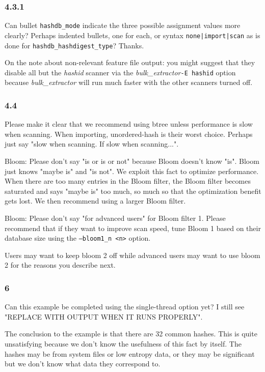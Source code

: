 \documentclass[12pt,twoside]{article}
\newcommand{\bulk}{\emph{bulk\_extractor}\xspace}
\newcommand{\hid}{\emph{hashid}\xspace}
\begin{document}
\subsubsection*{4.3.1}
Can bullet \texttt{hashdb\_mode} indicate the three possible assignment values
more clearly?
Perhaps indented bullets, one for each, or syntax \texttt{none|import|scan}
as is done for \texttt{hashdb\_hashdigest\_type}?  Thanks.

On the note about non-relevant feature file output: you might suggest that they
disable all but the \hid scanner via the \bulk \texttt{-E hashid} option
because \bulk will run much faster with the other scanners turned off.

\subsubsection*{4.4}
Please make it clear that we recommend using btree unless performance
is slow when scanning.
When importing, unordered-hash is their worst choice.
Perhaps just say "slow when scanning.  If slow when scanning...".

Bloom: Please don't say "is or is or not" because Bloom doesn't know "is".
Bloom just knows "maybe is" and "is not".
We exploit this fact to optimize performance.
When there are too many entries in the Bloom filter,
the Bloom filter becomes saturated and says "maybe is" too much,
so much so that the optimization benefit gets lost.
We then recommend using a larger Bloom filter.

Bloom: Please don't say "for advanced users" for Bloom filter 1.
Please recommend that if they want to improve scan speed,
tune Bloom 1 based on their database size
using the \texttt{--bloom1\_n <n>} option.

Users may want to keep bloom 2 off while advanced users may want to use bloom 2
for the reasons you describe next.

\subsubsection*{6}
Can this example be completed using the single-thread option yet?
I still see "REPLACE WITH OUTPUT WHEN IT RUNS PROPERLY".

The conclusion to the example is that there are 32 common hashes.
This is quite unsatisfying because we don't know the usefulness of this fact
by itself.
The hashes may be from system files or low entropy data,
or they may be significant but we don't know what data they correspond to.
\end{document}

